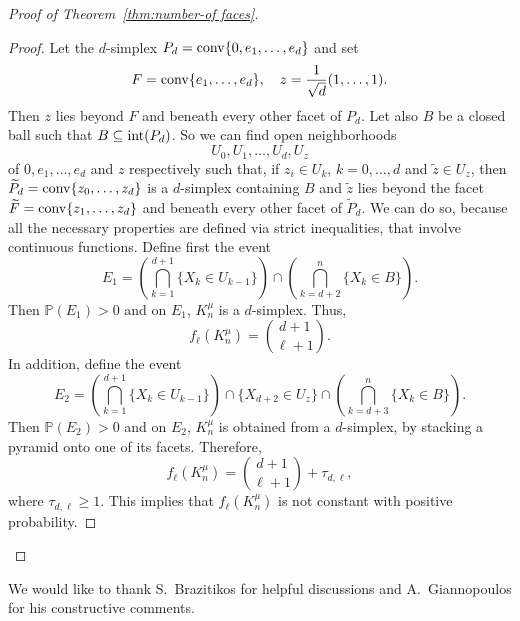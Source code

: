 \documentclass[10pt]{amsart}
\newcommand{\1}{\textbf{1}}
\newcommand{\conv}{{\rm conv}}
\numberwithin{equation}{section} %
\theoremstyle{remark}
\theoremstyle{definition}
\begin{document}
\begin{proof}[Proof of Theorem~\ref{thm:number-of faces}]
    \begin{proof}
     Let the $d$-simplex $P_d=\conv\{0,e_1,\ldots,e_d\}$ and set \[F=\conv\{e_1,\ldots,e_d\}, \quad z=\frac{1}{\sqrt{d}}(1,\ldots,1).\]  Then $z$ lies beyond $F$ and beneath every other facet of $P_d$. Let also $B$ be a closed ball such that $B \subseteq {\rm int} (P_d)$. So we can find open neighborhoods \[U_0,U_1,\ldots,U_d,U_z\] of $0,e_1,\ldots,e_d$ and $z$ respectively such that, if $z_i \in U_k, \, k=0,\ldots,d$ and $\tilde{z} \in U_z$, then $\widetilde{P}_d=\conv\{z_0,\ldots,z_d\}$ is a $d$-simplex containing $B$ and $\tilde{z}$ lies beyond the facet $\widetilde{F}=\conv\{z_1,\ldots,z_d\}$ and beneath every other facet of $\widetilde{P}_d$. We can do so, because all the necessary properties are defined via strict inequalities, that involve continuous functions. Define first the event \[E_1=\left(\bigcap_{k=1}^{d+1}\big\{X_k \in U_{k-1}\}\right) \cap\left( \bigcap_{k=d+2}^{n} \big \{X_k \in B\}\right).\] Then $\mathbb{P}(E_1)>0$ and on $E_1$, $K_n^\mu$ is a $d$-simplex. Thus, \[f_\ell(K_n^\mu)=\binom{d+1}{\ell+1}.\] In addition, define the event \[E_2=\left(\bigcap_{k=1}^{d+1}\big\{X_k \in U_{k-1}\}\right) \cap  \big\{X_{d+2 }\in U_z\big\}\cap\left( \bigcap_{k=d+3}^{n} \big \{X_k \in B\}\right).\] Then $\mathbb{P}(E_2)>0$ and on $E_2$, $K_n^\mu$ is obtained from a $d$-simplex, by stacking a pyramid onto one of its facets. Therefore, \[f_\ell(K_n^\mu)=\binom{d+1}{\ell+1}+\tau_{d,\ell},\] where $\tau_{d,\ell} \geq 1$. This implies that $f_\ell(K_n^\mu)$ is not constant with positive probability.
    \end{proof}  
\end{proof}


\bigskip

 We would like to thank S.~Brazitikos for helpful discussions and A.~Giannopoulos for his constructive comments.

\bigskip


\footnotesize
\end{document}
